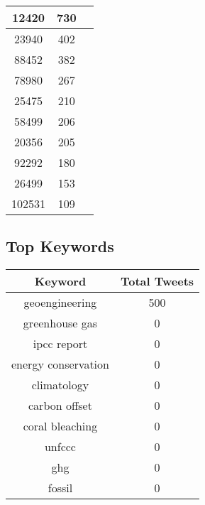 \documentclass{article}\usepackage[T1]{fontenc}
\begin{document}
\begin{tabular}{|c|c|c|}
 \hline
12420 & 730\\ 
 \hline
23940 & 402\\ 
 \hline
88452 & 382\\ 
 \hline
78980 & 267\\ 
 \hline
25475 & 210\\ 
 \hline
58499 & 206\\ 
 \hline
20356 & 205\\ 
 \hline
92292 & 180\\ 
 \hline
26499 & 153\\ 
 \hline
102531 & 109\\ 
 \hline
\end{tabular}\subsection*{Top Keywords}\begin{tabular}{|c|c|}         \hline         Keyword & Total Tweets \\ 
 \hline
geoengineering & 500\\ 
 \hline
greenhouse gas & 0\\ 
 \hline
ipcc report & 0\\ 
 \hline
energy conservation & 0\\ 
 \hline
climatology & 0\\ 
 \hline
carbon offset & 0\\ 
 \hline
coral bleaching & 0\\ 
 \hline
unfccc & 0\\ 
 \hline
ghg & 0\\ 
 \hline
fossil & 0\\ 
 \hline
\end{tabular}
\end{document}
